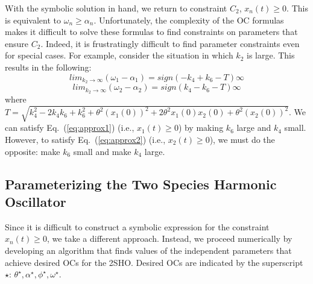 \documentclass{bmcart}
\newcommand{\eqn}[1]{Eq.~(\ref{#1})}
\newcommand{\tab}[1]{Table~\ref{#1}}
\begin{document}
With the symbolic solution in hand, we return to constraint $C_2$, $x_n (t) \geq 0.$ This is equivalent to $\omega_n \geq \alpha_n.$ Unfortunately, the complexity of the OC formulas makes it difficult to solve these formulas to find constraints on parameters that ensure $C_2$. Indeed, it is frustratingly difficult to find parameter constraints even for special cases. For example, consider the situation in which $k_2$ is large. This results in the following:
\begin{equation}
    lim_{k_2 \rightarrow \infty} (\omega_1 - \alpha_1) =
    sign \left (- k_{4} + k_{6} - T \right) \infty
    \label{eq:approx1}
\end{equation}
\begin{equation}
    lim_{k_2 \rightarrow \infty} (\omega_2 - \alpha_2) =
    sign \left( k_{4} - k_{6} - T \right) \infty
    \label{eq:approx2}
\end{equation}
where
$T = \sqrt{k_{4}^{2} - 2 k_{4} k_{6} + k_{6}^{2} + \theta^{2} (x_1 (0))^{2} + 2 \theta^{2} x_1 (0) x_2 (0) + \theta^{2} (x_2 (0))^{2}}.$
We can satisfy \eqn{eq:approx1} (i.e., $x_1 (t) \geq 0$) by making $k_6$ large and $k_4$ small. However, to satisfy \eqn{eq:approx2} (i.e., $x_2(t) \geq 0$), we must do the opposite: make $k_6$ small and make $k_4$ large.


    
\subsection*{Parameterizing the Two Species Harmonic Oscillator}
Since it is difficult to construct a symbolic expression for the constraint $x_n (t) \geq 0$, we take a different approach. Instead, we proceed numerically by developing an algorithm that finds
values of the independent parameters that achieve desired OCs for the 2SHO. Desired OCs are indicated by the superscript $\star$:
$\theta^{\star}, \alpha^{\star}, \phi^{\star}, \omega^{\star}$.
\end{document}
